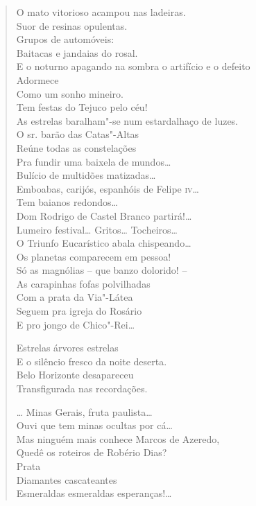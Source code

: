 \begin{verse}
O mato vitorioso acampou nas ladeiras.\\
Suor de resinas opulentas.\\
Grupos de automóveis:\\
Baitacas e jandaias do rosal.\\
E o noturno apagando na sombra o artifício e o defeito\\
Adormece\\
Como um sonho mineiro.\\
Tem festas do Tejuco pelo céu!\\
As estrelas baralham"-se num estardalhaço de luzes.\\
O sr. barão das Catas"-Altas\\
Reúne todas as constelações\\
Pra fundir uma baixela de mundos\ldots{}\\
Bulício de multidões matizadas\ldots{}\\
Emboabas, carijós, espanhóis de Felipe \textsc{iv}\ldots{}\\
Tem baianos redondos\ldots{}\\
Dom Rodrigo de Castel Branco partirá!\ldots{}\\
Lumeiro festival\ldots{} Gritos\ldots{} Tocheiros\ldots{}\\
O Triunfo Eucarístico abala chispeando\ldots{}\\
Os planetas comparecem em pessoa!\\
Só as magnólias -- que banzo dolorido! --\\
As carapinhas fofas polvilhadas\\
Com a prata da Via"-Látea\\
Seguem pra igreja do Rosário\\
E pro jongo de Chico"-Rei\ldots{}

Estrelas árvores estrelas\\
E o silêncio fresco da noite deserta.\\
Belo Horizonte desapareceu\\
Transfigurada nas recordações.

\ldots{} Minas Gerais, fruta paulista\ldots{}\\
Ouvi que tem minas ocultas por cá\ldots{}\\
Mas ninguém mais conhece Marcos de Azeredo,\\
Quedê os roteiros de Robério Dias?\\
\qquad\qquad\quad{}Prata\\
\qquad\quad{}Diamantes cascateantes\\
Esmeraldas esmeraldas esperanças!\ldots{}


\end{verse}
